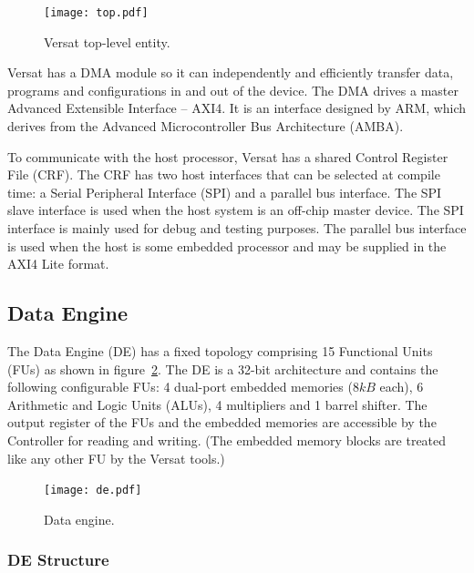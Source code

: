 \documentclass[journal]{IEEEtran}
\begin{document}
\begin{figure}[!h]
\centering \texttt{[image: top.pdf]}
\caption{Versat top-level entity.}
\label{fig_top}
\end{figure}

Versat has a DMA module so it can independently and efficiently
transfer data, programs and configurations in and out of the
device. The DMA drives a master Advanced Extensible Interface --
AXI4. It is an interface designed by ARM, which derives from the
Advanced Microcontroller Bus Architecture (AMBA).

To communicate with the host processor, Versat has a shared Control
Register File (CRF). The CRF has two host interfaces that can be
selected at compile time: a Serial Peripheral Interface (SPI) and a
parallel bus interface. The SPI slave interface is used when the host
system is an off-chip master device. The SPI interface is mainly used
for debug and testing purposes. The parallel bus interface is used
when the host is some embedded processor and may be supplied in the
AXI4 Lite format.


\subsection{Data Engine}
\label{section:dataEngine}

The Data Engine (DE) has a fixed topology comprising 15 Functional
Units (FUs) as shown in figure~\ref{fig_de}. The DE is a 32-bit
architecture and contains the following configurable FUs: 4 dual-port
embedded memories ($8kB$ each), 6 Arithmetic and Logic Units (ALUs), 4
multipliers and 1 barrel shifter. The output register of the FUs and
the embedded memories are accessible by the Controller for reading and
writing. (The embedded memory blocks are treated like any other FU by
the Versat tools.)

\begin{figure}[!h]
\centering
\texttt{[image: de.pdf]}
\caption{Data engine.}
\label{fig_de}
\end{figure}

\subsubsection{DE Structure}
\label{subsection:DEStructure}
\end{document}
